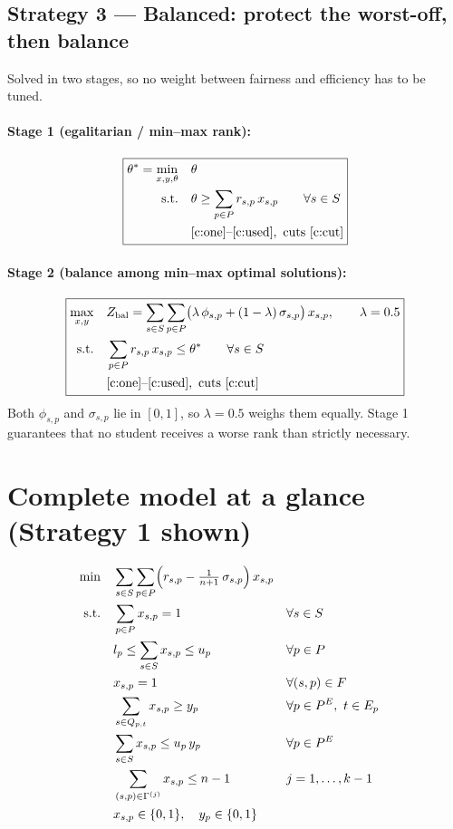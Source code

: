 \documentclass[11pt,a4paper]{article}
\begin{document}
\subsection{Strategy 3 --- Balanced: protect the worst-off, then balance}
Solved in two stages, so no weight between fairness and efficiency has to be tuned.

\paragraph{Stage 1 (egalitarian / min--max rank):}
\begin{equation}
\boxed{
\begin{aligned}
\theta^{*} = \min_{x,y,\theta}\quad & \theta\\
\text{s.t.}\quad & \theta \ge \sum_{p \in P} r_{s,p}\,x_{s,p} \qquad \forall s \in S\\
& \eqref{c:one}\text{--}\eqref{c:used},\ \text{cuts } \eqref{c:cut}
\end{aligned}}
\end{equation}

\paragraph{Stage 2 (balance among min--max optimal solutions):}
\begin{equation}
\boxed{
\begin{aligned}
\max_{x,y}\quad & Z_{\text{bal}} = \sum_{s \in S}\sum_{p \in P} \bigl(\lambda\,\phi_{s,p} + (1-\lambda)\,\sigma_{s,p}\bigr)\,x_{s,p}, \qquad \lambda = 0.5\\
\text{s.t.}\quad & \sum_{p \in P} r_{s,p}\,x_{s,p} \le \theta^{*} \qquad \forall s \in S\\
& \eqref{c:one}\text{--}\eqref{c:used},\ \text{cuts } \eqref{c:cut}
\end{aligned}}
\end{equation}
Both $\phi_{s,p}$ and $\sigma_{s,p}$ lie in $[0,1]$, so $\lambda = 0.5$ weighs them equally. Stage 1 guarantees that no student
receives a worse rank than strictly necessary.

\section{Complete model at a glance (Strategy 1 shown)}
\begin{alignat*}{2}
\min\quad & \sum_{s \in S}\sum_{p \in P} \Bigl(r_{s,p} - \tfrac{1}{n+1}\,\sigma_{s,p}\Bigr)\,x_{s,p} \\
\text{s.t.}\quad & \sum_{p \in P} x_{s,p} = 1 && \forall s \in S\\
& l_p \le \sum_{s \in S} x_{s,p} \le u_p && \forall p \in P\\
& x_{s,p} = 1 && \forall (s,p) \in F\\
& \sum_{s \in Q_{p,t}} x_{s,p} \ge y_p && \forall p \in P^{E},\ t \in E_p\\
& \sum_{s \in S} x_{s,p} \le u_p\,y_p && \forall p \in P^{E}\\
& \sum_{(s,p) \in \Gamma^{(j)}} x_{s,p} \le n - 1 \qquad && j = 1,\dots,k-1\\
& x_{s,p} \in \{0,1\},\quad y_p \in \{0,1\}
\end{alignat*}
\end{document}
